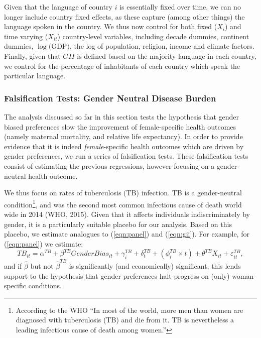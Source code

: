 \documentclass[11pt]{article}
\begin{document}
\begin{spacing}{1.4}
Given that the language of country $i$ is essentially fixed over time, we can no
longer include country fixed effects, as these capture (among other things) the
language spoken in the country.  We thus now control for both fixed ($X_{i}$) 
and time varying ($X_{it}$) country-level variables, including decade dummies, 
continent dummies, $\log($GDP$)$, the log of population, religion, income and 
climate factors.  Finally, given that $GII$ is defined based on the majority
language in each country, we control for the percentage of inhabitants of each
country which speak the particular language.

\subsubsection{Falsification Tests: Gender Neutral Disease Burden}
\label{ssscn:TB}
The analysis discussed so far in this section tests the hypothesis that gender
biased preferences slow the improvement of female-specific health outcomes 
(namely maternal mortality, and relative life expectancy).  In order to provide
evidence that it is indeed \emph{female}-specific health outcomes which are 
driven by gender preferences, we run a series of falsification tests.  These
falsification tests consist of estimating the previous regressions, however 
focusing on a gender-neutral health outcome.

We thus focus on rates of tuberculosis (TB) infection.  TB is a gender-neutral
condition\footnote{According to the WHO ``In most of the world, more men than 
women are diagnosed with tuberculosis (TB) and die from it. TB is nevertheless 
a leading infectious cause of death among women.''}, %
 and was the second most common infectious cause of death world wide in 2014 
(WHO, 2015). %
Given that it affects individuals indiscriminately by gender, it is a
 particularly suitable placebo for our analysis.  Based on this placebo, we 
estimate analogues to (\ref{eqn:panel}) and (\ref{eqn:gii}).  For example, for 
(\ref{eqn:panel}) we estimate:
\begin{equation}
TB_{it} = \alpha^{TB} + \beta^{TB} GenderBias_{it} + \gamma^{TB}_i + \delta^{TB}_t + 
               (\phi^{TB}_i\times t) + \theta^{TB} X_{it} + \varepsilon^{TB}_{it},
\end{equation}
and if $\hat\beta$ but not $\hat\beta^{TB}$ is significantly (and economically)
significant, this lends support to the hypothesis that gender preferences halt
progress on (only) woman-specific conditions.



\end{spacing}
\end{document}
